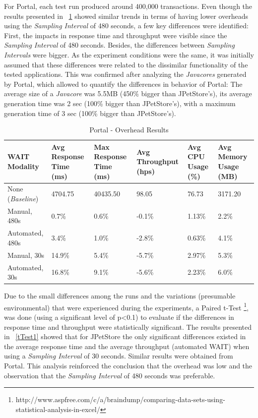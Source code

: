 \documentclass[runningheads,a4paper]{llncs}
\begin{document}
For Portal, each test run produced around 400,000 transactions. Even though the
results presented in \tablename ~\ref{Portal1} showed similar trends in terms of
having lower overheads using the \emph{Sampling Interval} of 480 seconds, a few
key differences were identified: First, the impacts in response time and
throughput were visible since the \emph{Sampling Interval} of 480 seconds.
Besides, the differences between \emph{Sampling Intervals} were bigger. As the
experiment conditions were the same, it was initially assumed that these differences 
were related to the dissimilar functionality of the tested applications. This was confirmed 
after analyzing the \emph{Javacores} generated by Portal, which allowed to
quantify the differences in behavior of Portal: The average size of a \emph{Javacore} was
5.5MB (450\% bigger than JPetStore's), its average generation time was 2 sec
(100\% bigger than JPetStore's), with a maximum generation time of 3 sec (100\%
bigger than JPetStore's).

\begin{table}[!h]
\caption{Portal - Overhead Results}
\label{Portal1}
\centering
\begin{tabular}{p{}|p{}|p{}|p{}|p{}|p{}}
\hline
\bfseries WAIT Modality & \bfseries Avg Response Time (ms)& \bfseries Max
Response Time (ms)& \bfseries Avg Throughput (hps)& \bfseries Avg CPU Usage
(\%) & \bfseries Avg Memory Usage (MB)\\
\hline
None (\emph{Baseline}) 	& 4704.75	& 40435.50	& 98.05 	& 76.73 	& 3171.20\\
Manual, 480s 			& 0.7\% 	& 0.6\%		& -0.1\%	& 1.13\% 	& 2.2\%\\
Automated, 480s 		& 3.4\%		& 1.0\%		& -2.8\% 	& 0.63\% 	& 4.1\%\\
Manual, 30s 			& 14.9\%	& 5.4\%		& -5.7\% 	& 2.97\% 	& 5.3\%\\
Automated, 30s 			& 16.8\%	& 9.1\%		& -5.6\% 	& 2.23\% 	& 6.0\%\\
\hline
\end{tabular}
\end{table}

Due to the small differences among the runs and the variations (presumable
environmental) that were experienced during the experiments, a Paired t-Test
\footnote{http://www.aspfree.com/c/a/braindump/comparing-data-sets-using-statistical-analysis-in-excel/},
was done (using a significant level of p\textless0.1) to evaluate if the
differences in response time and throughput were statistically significant. 
The results presented in \tablename ~\ref{tTest1} showed that for JPetStore
the only significant differences existed in the average response time and the
average throughput (automated WAIT) when using a \emph{Sampling Interval} of 30
seconds. Similar results were obtained from Portal. This analysis reinforced the
conclusion that the overhead was low and the observation that the
\emph{Sampling Interval} of 480 seconds was preferable.
\end{document}
